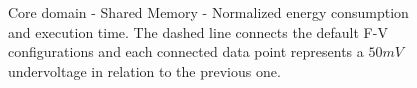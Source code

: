 
\begin{figure}[!htb]
    \centering
    \begin{subfigmatrix}{2}
      \label{fig:sm_behaviour}
    \end{subfigmatrix}
    \caption{Core domain - Shared Memory - Normalized energy consumption and execution time. The dashed line connects the default F-V configurations and each connected data point represents a $50mV$ undervoltage in relation to the previous one.}
\end{figure}

